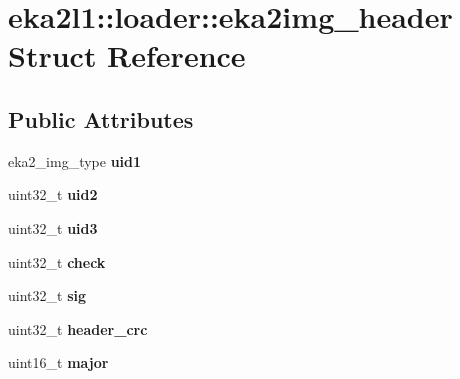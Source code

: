 \hypertarget{structeka2l1_1_1loader_1_1eka2img__header}{}\section{eka2l1\+:\+:loader\+:\+:eka2img\+\_\+header Struct Reference}
\label{structeka2l1_1_1loader_1_1eka2img__header}
\subsection*{Public Attributes}
\begin{DoxyCompactItemize}
\item 
\mbox{\label{structeka2l1_1_1loader_1_1eka2img__header_aa5ba21d670b6464ae73f1f332fb2e151}} 
eka2\+\_\+img\+\_\+type {\bfseries uid1}
\item 
\mbox{\label{structeka2l1_1_1loader_1_1eka2img__header_ab2aba0e0c39a4914ad802f04ed4adae8}} 
uint32\+\_\+t {\bfseries uid2}
\item 
\mbox{\label{structeka2l1_1_1loader_1_1eka2img__header_a281a89cfd6b8e2c95ac7c284b92db9ba}} 
uint32\+\_\+t {\bfseries uid3}
\item 
\mbox{\label{structeka2l1_1_1loader_1_1eka2img__header_a241ddf4c9503f232bbbfe92bb110208b}} 
uint32\+\_\+t {\bfseries check}
\item 
\mbox{\label{structeka2l1_1_1loader_1_1eka2img__header_ae881987123cc9301884018c1684e9d72}} 
uint32\+\_\+t {\bfseries sig}
\item 
\mbox{\label{structeka2l1_1_1loader_1_1eka2img__header_abbc3d4b33d9210f9eb48cd404e680edb}} 
uint32\+\_\+t {\bfseries header\+\_\+crc}
\item 
\mbox{\label{structeka2l1_1_1loader_1_1eka2img__header_a701b51de158824600d7bbd7362ef9a49}} 
uint16\+\_\+t {\bfseries major}
\item 
\mbox{\label{structeka2l1_1_1loader_1_1eka2img__header_a738e357d79732217059c18498f6062aa}} 

\end{DoxyCompactItemize}
